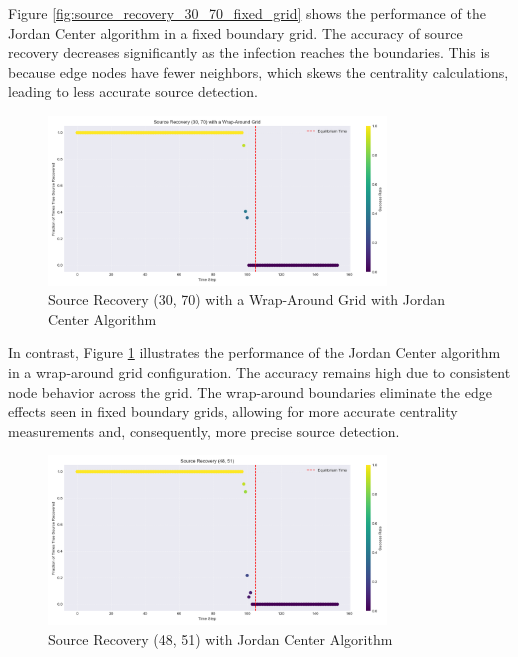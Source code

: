 Figure \ref{fig:source_recovery_30_70_fixed_grid} shows the performance of the Jordan Center algorithm in a fixed boundary grid. The accuracy of source recovery decreases significantly as the infection reaches the boundaries. This is because edge nodes have fewer neighbors, which skews the centrality calculations, leading to less accurate source detection.

\begin{figure}[H]
    \centering
    \includegraphics[width=0.8\textwidth]{source_recovery_30_70_Wrap_Around_Grid.png}
    \caption{Source Recovery (30, 70) with a Wrap-Around Grid with Jordan Center Algorithm}
    \label{fig:source_recovery_30_70_wrap_around_grid}
\end{figure}

In contrast, Figure \ref{fig:source_recovery_30_70_wrap_around_grid} illustrates the performance of the Jordan Center algorithm in a wrap-around grid configuration. The accuracy remains high due to consistent node behavior across the grid. The wrap-around boundaries eliminate the edge effects seen in fixed boundary grids, allowing for more accurate centrality measurements and, consequently, more precise source detection.

\begin{figure}[H]
    \centering
    \includegraphics[width=0.8\textwidth]{source_recovery_48_51.png}
    \caption{Source Recovery (48, 51) with Jordan Center Algorithm}
    \label{fig:source_recovery_48_51}
\end{figure}

